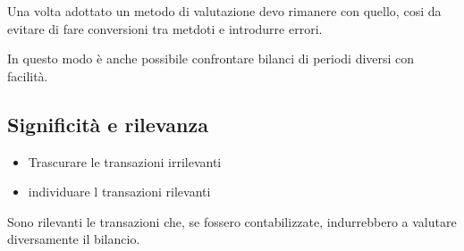 Una volta adottato un metodo di valutazione devo rimanere con quello, cosi da evitare di fare conversioni tra metdoti e introdurre errori.

In questo modo è anche possibile confrontare bilanci di periodi diversi con facilità.


\subsection{Significità e rilevanza}

\begin{itemize}
    \item Trascurare le transazioni irrilevanti
    \item individuare l transazioni rilevanti
\end{itemize}

Sono rilevanti le transazioni che, se fossero contabilizzate, indurrebbero a valutare diversamente il bilancio.

